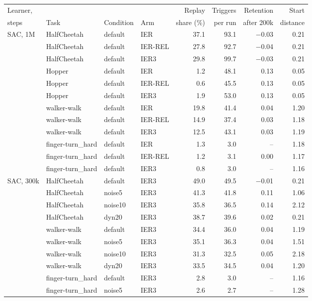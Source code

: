 \begin{tabular}{llllrrrr}
\toprule
Learner, & & & & Replay & Triggers & Retention & Start \\
steps & Task & Condition & Arm & share (\%) & per run & after 200k & distance \\
\midrule
SAC, 1M & HalfCheetah & default & IER & 37.1 & 93.1 & $-$0.03 & 0.21 \\
 & HalfCheetah & default & IER-REL & 27.8 & 92.7 & $-$0.04 & 0.21 \\
 & HalfCheetah & default & IER3 & 29.8 & 99.7 & $-$0.03 & 0.21 \\
 & Hopper & default & IER & 1.2 & 48.1 & 0.13 & 0.05 \\
 & Hopper & default & IER-REL & 0.6 & 45.5 & 0.13 & 0.05 \\
 & Hopper & default & IER3 & 1.9 & 53.0 & 0.13 & 0.05 \\
 & walker-walk & default & IER & 19.8 & 41.4 & 0.04 & 1.20 \\
 & walker-walk & default & IER-REL & 14.9 & 37.4 & 0.03 & 1.18 \\
 & walker-walk & default & IER3 & 12.5 & 43.1 & 0.03 & 1.19 \\
 & finger-turn\_hard & default & IER & 1.3 & 3.0 & -- & 1.18 \\
 & finger-turn\_hard & default & IER-REL & 1.2 & 3.1 & 0.00 & 1.17 \\
 & finger-turn\_hard & default & IER3 & 0.8 & 3.0 & -- & 1.16 \\
\midrule
SAC, 300k & HalfCheetah & default & IER3 & 49.0 & 49.5 & $-$0.01 & 0.21 \\
 & HalfCheetah & noise5 & IER3 & 41.3 & 41.8 & 0.11 & 1.06 \\
 & HalfCheetah & noise10 & IER3 & 35.8 & 36.5 & 0.14 & 2.12 \\
 & HalfCheetah & dyn20 & IER3 & 38.7 & 39.6 & 0.02 & 0.21 \\
 & walker-walk & default & IER3 & 34.4 & 36.0 & 0.04 & 1.19 \\
 & walker-walk & noise5 & IER3 & 35.1 & 36.3 & 0.04 & 1.51 \\
 & walker-walk & noise10 & IER3 & 31.3 & 32.5 & 0.05 & 2.18 \\
 & walker-walk & dyn20 & IER3 & 33.5 & 34.5 & 0.04 & 1.20 \\
 & finger-turn\_hard & default & IER3 & 2.8 & 3.0 & -- & 1.16 \\
 & finger-turn\_hard & noise5 & IER3 & 2.6 & 2.7 & -- & 1.28 \\

\end{tabular}
